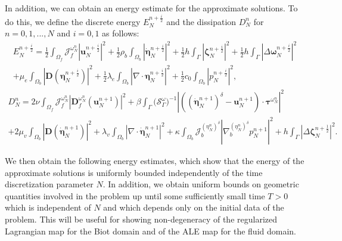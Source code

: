 \documentclass[11pt]{article}
\newcommand{\bd}{\boldsymbol}
\theoremstyle{definition}
\begin{document}
In addition, we can obtain an energy estimate for the approximate solutions. To do this, we define the discrete energy $E^{n + \frac{i}{2}}_{N}$ and the dissipation $D^{n}_{N}$ for $n = 0, 1, ..., N$ and $i = 0, 1$ as follows:
\begin{multline*}
E^{n + \frac{i}{2}}_{N} = \frac{1}{2} \int_{\Omega_{f}} \mathcal{J}^{\omega^{n}_{N}}_{f} |\bd{u}^{n + \frac{i}{2}}_{N}|^{2} + \frac{1}{2}\rho_{b} \int_{\Omega_{b}} |\dot{\bd{\eta}}^{n + \frac{i}{2}}_{N}|^{2} + \frac{1}{2}  h \int_{\Gamma} |\bd{\zeta}^{n + \frac{i}{2}}_{N}|^{2} + \frac{1}{2} h \int_{\Gamma} |\Delta \bd{\omega}^{n + \frac{i}{2}}_{N}|^{2} \\
+ \mu_{e} \int_{\Omega_{b}} |\bd{D}(\bd{\eta}^{n + \frac{i}{2}}_{N})|^{2} + \frac{1}{2}\lambda_{e} \int_{\Omega_{b}} |\nabla \cdot \bd{\eta}^{n + \frac{i}{2}}_{N}|^{2} + \frac{1}{2} c_{0} \int_{\Omega_{b}} |p^{n + \frac{i}{2}}_{N}|^{2},
\end{multline*}
\begin{multline*}
D^{n}_{N} = 2\nu \int_{\Omega_{f}} \mathcal{J}^{\omega^{n}_{N}}_{f} |\bd{D}^{\omega^{n}_{N}}_{f}(\bd{u}^{n + 1}_{N})|^{2} + \beta \int_{\Gamma} \Big(\mathcal{S}^{\omega}_{\Gamma}\Big)^{-1} \left|\left(\left(\dot{\bd{\eta}}^{n + 1}_{N}\right)^{\delta} - \bd{u}^{n + 1}_{N}\right) \cdot \bd{\tau}^{\omega^{n}_{N}}\right|^{2} \\
+ 2\mu_{v} \int_{\Omega_{b}} |\bd{D}(\dot{\bd{\eta}}^{n + 1}_{N})|^{2} + \lambda_{v} \int_{\Omega_{b}} |\nabla \cdot \dot{\bd{\eta}}^{n + 1}_{N}|^{2} + \kappa \int_{\Omega_{b}} \mathcal{J}^{(\eta^{n}_{N})^{\delta}}_{b} \left|\nabla^{(\eta^{n}_{N})^{\delta}}_{b} p^{n + 1}_{N}\right|^{2} + h\int_{\Gamma} |\Delta \bd{\zeta}^{n + \frac{1}{2}}_{N}|^{2}.
\end{multline*}

We then obtain the following energy estimates, which show that the energy of the approximate solutions is uniformly bounded independently of the time discretization parameter $N$. In addition, we obtain uniform bounds on geometric quantities involved in the problem up until some sufficiently small time $T > 0$ which is independent of $N$ and which depends only on the initial data of the problem. This will be useful for showing non-degeneracy of the regularized Lagrangian map for the Biot domain and of the ALE map for the fluid domain.
\end{document}

